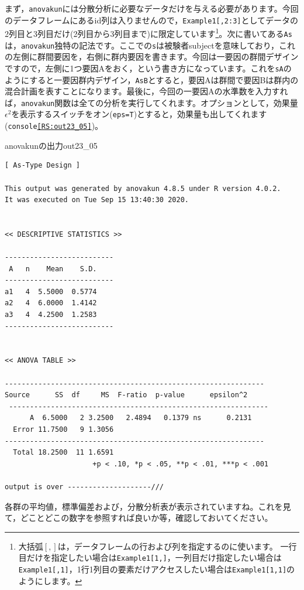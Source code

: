 \documentclass{ltjsarticle}
\begin{document}
まず，\texttt{anovakun}には分散分析に必要なデータだけを与える必要があります。今回のデータフレームにあるid列は入りませんので，\texttt{Example1[,2:3]}としてデータの2列目と3列目だけ(2列目から3列目まで)に限定しています\footnote{大括弧$\left[, \right]$は，データフレームの行および列を指定するのに使います。 一行目だけを指定したい場合は\texttt{Example1[1,]}，一列目だけ指定したい場合は\texttt{Example1[,1]}，1行1列目の要素だけアクセスしたい場合は\texttt{Example1[1,1]}のようにします。}。次に書いてある\texttt{As}は，\texttt{anovakun}独特の記法です。ここでの\texttt{s}は被験者subjectを意味しており，これの左側に群間要因を，右側に群内要因を書きます。今回は一要因の群間デザインですので，左側に1つ要因Aをおく，という書き方になっています。これを\texttt{sA}のようにすると一要因群内デザイン，\texttt{AsB}とすると，要因Aは群間で要因Bは群内の混合計画を表すことになります。最後に，今回の一要因Aの水準数を入力すれば，\texttt{anovakun}関数は全ての分析を実行してくれます。オプションとして，効果量$\epsilon^2$を表示するスイッチをオン(\texttt{eps=T})とすると，効果量も出してくれます(\texttt{console\ref{RS:out23_05}})。

\begin{Rscreen}{anovakunの出力}{out23_05}

\begin{verbatim}
[ As-Type Design ]

This output was generated by anovakun 4.8.5 under R version 4.0.2.
It was executed on Tue Sep 15 13:40:30 2020.
    
     
<< DESCRIPTIVE STATISTICS >>
    
--------------------------
 A   n    Mean    S.D. 
--------------------------
a1   4  5.5000  0.5774 
a2   4  6.0000  1.4142 
a3   4  4.2500  1.2583 
--------------------------
    
    
<< ANOVA TABLE >>
    
--------------------------------------------------------------
Source      SS  df     MS  F-ratio  p-value      epsilon^2 
 --------------------------------------------------------------
      A  6.5000   2 3.2500   2.4894   0.1379 ns      0.2131 
  Error 11.7500   9 1.3056                                  
--------------------------------------------------------------
  Total 18.2500  11 1.6591                                  
                     +p < .10, *p < .05, **p < .01, ***p < .001

output is over --------------------///
\end{verbatim}
\end{Rscreen}
各群の平均値，標準偏差および，分散分析表が表示されていますね。これを見て，どことどこの数字を参照すれば良いか等，確認しておいてください。
\end{document}
